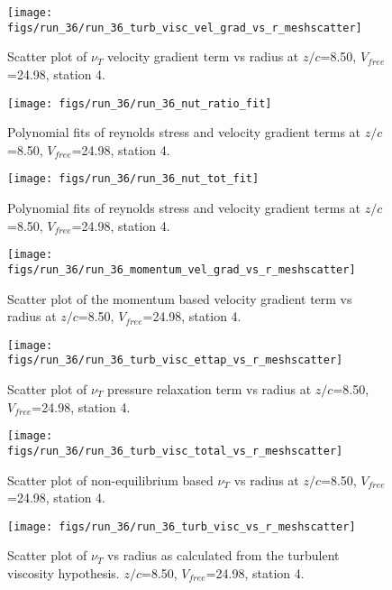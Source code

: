 \begin{figure}[H]
\centering
\texttt{[image: figs/run\_36/run\_36\_turb\_visc\_vel\_grad\_vs\_r\_meshscatter]}
\caption{Scatter plot of $\nu_T$ velocity gradient term vs radius at $z/c$=8.50, $V_{free}$=24.98, station 4.}
\end{figure}


\begin{figure}[H]
\centering
\texttt{[image: figs/run\_36/run\_36\_nut\_ratio\_fit]}
\caption{Polynomial fits of reynolds stress and velocity gradient terms at $z/c$=8.50, $V_{free}$=24.98, station 4.}
\end{figure}


\begin{figure}[H]
\centering
\texttt{[image: figs/run\_36/run\_36\_nut\_tot\_fit]}
\caption{Polynomial fits of reynolds stress and velocity gradient terms at $z/c$=8.50, $V_{free}$=24.98, station 4.}
\end{figure}


\begin{figure}[H]
\centering
\texttt{[image: figs/run\_36/run\_36\_momentum\_vel\_grad\_vs\_r\_meshscatter]}
\caption{Scatter plot of the momentum based velocity gradient term vs radius at $z/c$=8.50, $V_{free}$=24.98, station 4.}
\end{figure}


\begin{figure}[H]
\centering
\texttt{[image: figs/run\_36/run\_36\_turb\_visc\_ettap\_vs\_r\_meshscatter]}
\caption{Scatter plot of $\nu_T$ pressure relaxation term vs radius at $z/c$=8.50, $V_{free}$=24.98, station 4.}
\end{figure}


\begin{figure}[H]
\centering
\texttt{[image: figs/run\_36/run\_36\_turb\_visc\_total\_vs\_r\_meshscatter]}
\caption{Scatter plot of non-equilibrium based $\nu_T$ vs radius at $z/c$=8.50, $V_{free}$=24.98, station 4.}
\end{figure}


\begin{figure}[H]
\centering
\texttt{[image: figs/run\_36/run\_36\_turb\_visc\_vs\_r\_meshscatter]}
\caption{Scatter plot of $\nu_T$ vs radius as calculated from the turbulent viscosity hypothesis. $z/c$=8.50, $V_{free}$=24.98, station 4.}
\end{figure}


